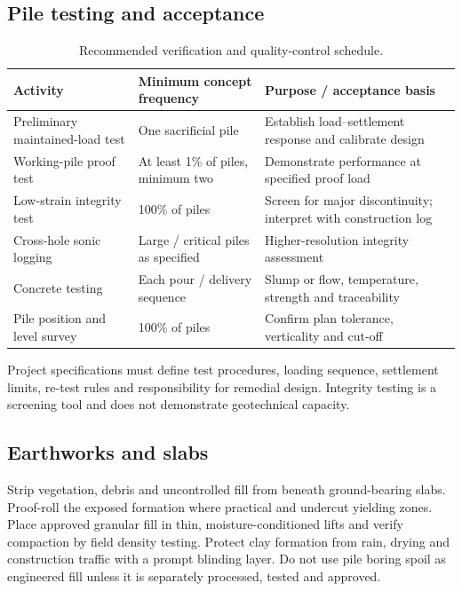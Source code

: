 \subsection{Pile testing and acceptance}
\begin{table}[H]
\centering
\caption{Recommended verification and quality-control schedule.}
\label{tab:qa}
\begin{tabularx}{\textwidth}{@{}L{38mm}L{31mm}Y@{}}
\toprule
{}
\textbf{Activity} & \textbf{Minimum concept frequency} & \textbf{Purpose / acceptance basis} \\
\midrule
Preliminary maintained-load test & One sacrificial pile & Establish load--settlement response and calibrate design \\
Working-pile proof test & At least 1\% of piles, minimum two & Demonstrate performance at specified proof load \\
Low-strain integrity test & 100\% of piles & Screen for major discontinuity; interpret with construction log \\
Cross-hole sonic logging & Large / critical piles as specified & Higher-resolution integrity assessment \\
Concrete testing & Each pour / delivery sequence & Slump or flow, temperature, strength and traceability \\
Pile position and level survey & 100\% of piles & Confirm plan tolerance, verticality and cut-off \\
\bottomrule
\end{tabularx}
\end{table}

Project specifications must define test procedures, loading sequence, settlement limits,
re-test rules and responsibility for remedial design. Integrity testing is a screening tool and
does not demonstrate geotechnical capacity.

\subsection{Earthworks and slabs}
Strip vegetation, debris and uncontrolled fill from beneath ground-bearing slabs. Proof-roll the
exposed formation where practical and undercut yielding zones. Place approved granular fill in
thin, moisture-conditioned lifts and verify compaction by field density testing. Protect clay
formation from rain, drying and construction traffic with a prompt blinding layer. Do not use
pile boring spoil as engineered fill unless it is separately processed, tested and approved.

